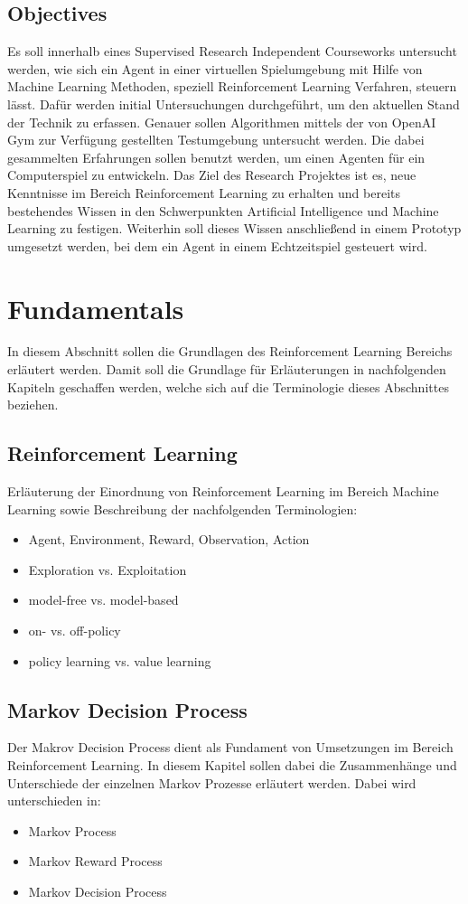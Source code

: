 \documentclass[11pt]{scrartcl}
\begin{document}
\subsection{Objectives}
Es soll innerhalb eines Supervised Research Independent Courseworks untersucht werden, wie
sich ein Agent in einer virtuellen Spielumgebung mit Hilfe von Machine Learning Methoden,
speziell Reinforcement Learning Verfahren, steuern lässt. Dafür werden initial
Untersuchungen durchgeführt, um den aktuellen Stand der Technik zu erfassen. Genauer
sollen Algorithmen mittels der von OpenAI Gym zur Verfügung gestellten Testumgebung
untersucht werden. Die dabei gesammelten Erfahrungen sollen benutzt werden, um einen
Agenten für ein Computerspiel zu entwickeln. Das Ziel des Research Projektes ist es, neue
Kenntnisse im Bereich Reinforcement Learning zu erhalten und bereits bestehendes Wissen in
den Schwerpunkten Artificial Intelligence und Machine Learning zu festigen. Weiterhin soll
dieses Wissen anschließend in einem Prototyp umgesetzt werden, bei dem ein Agent in einem
Echtzeitspiel gesteuert wird.

\newpage
\section{Fundamentals}
In diesem Abschnitt sollen die Grundlagen des Reinforcement Learning Bereichs erläutert werden. Damit soll die Grundlage für Erläuterungen in nachfolgenden Kapiteln geschaffen werden, welche sich auf die Terminologie dieses Abschnittes beziehen.
\subsection{Reinforcement Learning}
Erläuterung der Einordnung von Reinforcement Learning im Bereich Machine Learning sowie Beschreibung der nachfolgenden Terminologien:
\begin{itemize}
\itemsep0pt
\item Agent, Environment, Reward, Observation, Action
\item Exploration vs. Exploitation
\item model-free vs. model-based
\item on- vs. off-policy
\item policy learning vs. value learning
\end{itemize}
\subsection{Markov Decision Process}
Der Makrov Decision Process dient als Fundament von Umsetzungen im Bereich Reinforcement Learning. In diesem Kapitel sollen dabei die Zusammenhänge und Unterschiede der einzelnen Markov Prozesse erläutert werden. Dabei wird unterschieden in:
\begin{itemize}
\itemsep0pt
\item Markov Process
\item Markov Reward Process
\item Markov Decision Process 
\end{itemize}
\end{document}
